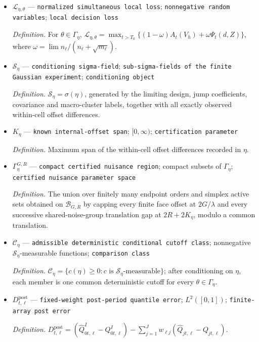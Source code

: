 \documentclass{article}
\begin{document}
\begin{itemize}
  \item \(\mathcal L_{\eta,\theta}\) --- \texttt{normalized simultaneous local loss}; \texttt{nonnegative random variables}; \texttt{local decision loss}
  \par\smallskip\noindent\emph{Definition.} For \(\theta\in\Gamma_\eta\), \(\mathcal L_{\eta,\theta}=\max_{t>T_0}\{(1-\omega)A_t(V_h)+\omega\Psi_t(d,Z)\}\), where \(\omega=\lim n_\ell/(n_\ell+\sqrt{m_\ell})\).
  \item \(\mathscr S_\eta\) --- \texttt{conditioning sigma-\allowbreak{}field}; \texttt{sub-\allowbreak{}sigma-\allowbreak{}fields of the finite Gaussian experiment}; \texttt{conditioning object}
  \par\smallskip\noindent\emph{Definition.} \(\mathscr S_\eta=\sigma(\eta)\), generated by the limiting design, jump coefficients, covariance and macro-cluster labels, together with all exactly observed within-cell offset differences.
  \item \(K_\eta\) --- \texttt{known internal-\allowbreak{}offset span}; \([0,\infty)\); \texttt{certification parameter}
  \par\smallskip\noindent\emph{Definition.} Maximum span of the within-cell offset differences recorded in \(\eta\).
  \item \(\Gamma_\eta^{G,R}\) --- \texttt{compact certified nuisance region}; compact subsets of \(\Gamma_\eta\); \texttt{certified nuisance parameter space}
  \par\smallskip\noindent\emph{Definition.} The union over finitely many endpoint orders and simplex active sets obtained on \(\mathcal B_{G,R}\) by capping every finite face offset at \(2G/\lambda\) and every successive shared-noise-group translation gap at \(2R+2K_\eta\), modulo a common translation.
  \item \(\mathscr C_\eta\) --- \texttt{admissible deterministic conditional cutoff class}; nonnegative \(\mathscr S_\eta\)-measurable functions; \texttt{comparison class}
  \par\smallskip\noindent\emph{Definition.} \(\mathscr C_\eta=\{c(\eta)\geq0:c\text{ is }\mathscr S_\eta\text{-measurable}\}\); after conditioning on \(\eta\), each member is one common deterministic cutoff for every \(\theta\in\Gamma_\eta\).
  \item \(D^{\mathrm{post}}_{t,\ell}\) --- \texttt{fixed-\allowbreak{}weight post-\allowbreak{}period quantile error}; \(L^2([0,1])\); \texttt{finite-\allowbreak{}array post error}
  \par\smallskip\noindent\emph{Definition.} \(D^{\mathrm{post}}_{t,\ell}=(\widehat Q^I_{0t,\ell}-Q^I_{0t,\ell})-\sum_{j=1}^Jw_{\ell j}(\widehat Q_{jt,\ell}-Q_{jt,\ell})\).

\end{itemize}
\end{document}
